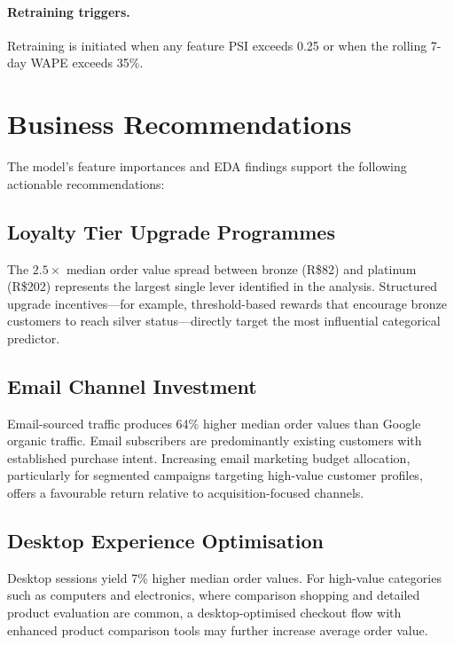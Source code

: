 \documentclass[11pt,a4paper]{article}
\begin{document}
\paragraph{Retraining triggers.}
Retraining is initiated when any feature PSI exceeds 0.25 or when the rolling
7-day WAPE exceeds 35\%.

\section{Business Recommendations}
\label{sec:recs}

The model's feature importances and EDA findings support the following
actionable recommendations:

\subsection{Loyalty Tier Upgrade Programmes}

The $2.5\times$ median order value spread between bronze (R\$82) and platinum
(R\$202) represents the largest single lever identified in the analysis.
Structured upgrade incentives---for example, threshold-based rewards that
encourage bronze customers to reach silver status---directly target the most
influential categorical predictor.

\subsection{Email Channel Investment}

Email-sourced traffic produces 64\% higher median order values than Google
organic traffic.  Email subscribers are predominantly existing customers with
established purchase intent.  Increasing email marketing budget allocation,
particularly for segmented campaigns targeting high-value customer profiles,
offers a favourable return relative to acquisition-focused channels.

\subsection{Desktop Experience Optimisation}

Desktop sessions yield 7\% higher median order values.  For high-value
categories such as computers and electronics, where comparison shopping and
detailed product evaluation are common, a desktop-optimised checkout flow with
enhanced product comparison tools may further increase average order value.
\end{document}
